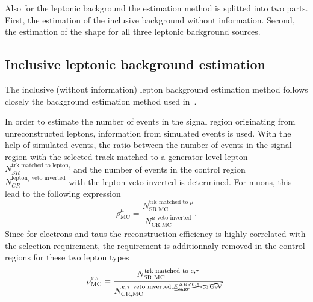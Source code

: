 

Also for the leptonic background the estimation method is splitted into two parts.
First, the estimation of the inclusive background without \ias information.
Second, the estimation of the \ias shape for all three leptonic background sources.


\subsection*{Inclusive leptonic background estimation}
The inclusive (without \ias information) lepton background estimation method follows closely the background estimation method used in~\cite{bib:CMS:DT_Thesis,bib:CMS:DT_8TeV_AN}.

In order to estimate the number of events in the signal region originating from unreconstructed leptons, information from simulated events is used.
With the help of simulated \WJets events, the ratio between the number of events in the signal region with the selected track matched to a generator-level lepton $N_{SR}^{\text{trk matched to lepton}_i}$
 and the number of events in the control region $N_{CR}^{\text{lepton}_i\text{ veto inverted}}$ with the lepton veto inverted is determined.
For muons, this lead to the following expression
\begin{equation*}
\rho_{\text{MC}}^{\mu} = \frac{N_{\text{SR,MC}}^{\text{trk matched to }\mu}}{N_{\text{CR,MC}}^{\mu \text{ veto inverted}}}.
\end{equation*}
Since for electrons and taus the reconstruction efficiency is highly correlated with the \ecalo selection requirement, the \ecalo requirement is additionnaly removed in the control regions for these two lepton types 
\begin{equation*}
\rho_{\text{MC}}^{e,\tau} = \frac{N_{\text{SR,MC}}^{\text{trk matched to }e,\tau}}{N_{\text{CR,MC}}^{e,\tau\text{ veto inverted}, \cancel{E^{\Delta R<0.5}_{\text{calo}}<5\,\text{Ge}\kern-0.06667em\text{V}}}}.
\end{equation*}

